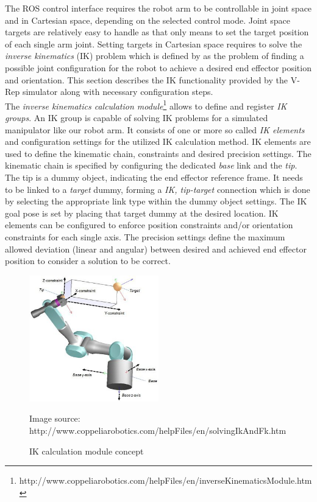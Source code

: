 The ROS control interface requires the robot arm to be controllable in joint space and in Cartesian space, depending on the selected control mode. Joint space targets are relatively easy to handle as that only means to set the target position of each single arm joint. Setting targets in Cartesian space requires to solve the \emph{inverse kinematics} (IK) problem which is defined by \citep{craig2005} as the problem of finding a possible joint configuration for the robot to achieve a desired end effector position and orientation. This section describes the IK functionality provided by the V-Rep simulator along with necessary configuration steps.\\

The \emph{inverse kinematics calculation module}\footnote{http://www.coppeliarobotics.com/helpFiles/en/inverseKinematicsModule.htm} allows to define and register \emph{IK groups}. An IK group is capable of solving IK problems for a simulated manipulator like our robot arm. It consists of one or more so called \emph{IK elements} and configuration settings for the utilized IK calculation method. IK elements are used to define the kinematic chain, constraints and desired precision settings. The kinematic chain is specified by configuring the dedicated \emph{base} link and the \emph{tip}. The tip is a dummy object, indicating the end effector reference frame. It needs to be linked to a \emph{target} dummy, forming a \emph{IK, tip-target} connection which is done by selecting the appropriate link type within the dummy object settings. The IK goal pose is set by placing that target dummy at the desired location. IK elements can be configured to enforce position constraints and/or orientation constraints for each single axis. The precision settings define the maximum allowed deviation (linear and angular) between desired and achieved end effector position to consider a solution to be correct. \\

\begin{figure}[htb]
	\centering
  	\includegraphics[width=0.5\textwidth]{images/ik_vrep.jpg}
	\caption{IK calculation module concept}
	{\scriptsize Image source: http://www.coppeliarobotics.com/helpFiles/en/solvingIkAndFk.htm}
	\label{fig:ik_vrep}
\end{figure}


